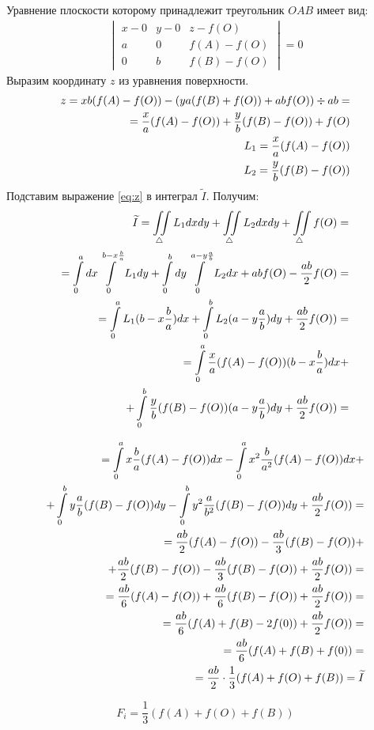 \documentclass{article}
\begin{document}
\begin{enumerate}
Уравнение плоскости которому принадлежит треугольник $OAB$ имеет вид:
\begin{align}
\begin{vmatrix}
  x-0	& y-0	& z-f(O)	\\
  a		& 0		& f(A)-f(O)	\\
  0		& b		& f(B)-f(O)
\end{vmatrix}
= 0
\end{align}
Выразим координату $z$ из уравнения поверхности.
\begin{align}
z = xb(f(A)-f(O))-(ya(f(B)+f(O))+abf(O)) \div ab = \notag \\
= \frac{x}{a}(f(A)-f(O))+\frac{y}{b}(f(B)-f(O)) + f(O) \label{eq:z} \\
L_1 = \frac{x}{a}(f(A)-f(O)) \\
L_2 = \frac{y}{b}(f(B)-f(O))
\end{align}
Подставим выражение \ref{eq:z} в интеграл $\widetilde{I}$. Получим:
\begin{align}
\widetilde{I} = \iint\limits_{\triangle} L_1 dx dy+\iint\limits_{\triangle} L_2 dx dy+\iint\limits_{\triangle} f(O)= \notag \\
= \int\limits_0^a dx \int\limits_0^{b-x \frac{b}{a}} L_1 dy + \int\limits_0^b dy \int\limits_0^{a-y \frac{a}{b}} L_2 dx + ab f(O)- \frac{ab}{2}f(O) = \notag \\
= \int\limits_0^a L_1 (b-x \frac{b}{a}) dx + \int\limits_0^b L_2 (a-y \frac{a}{b}) dy + \frac{ab}{2} f(O)) = \\
= \int\limits_0^a \frac{x}{a} (f(A)-f(O)) (b-x \frac{b}{a}) dx + \notag \\
+ \int\limits_0^b \frac{y}{b} (f(B)-f(O)) (a-y \frac{a}{b}) dy + \frac{ab}{2} f(O)) =
\end{align}

\begin{align}
= \int\limits_0^a x \frac{b}{a} (f(A)-f(O)) dx - \int\limits_0^a x^2 \frac{b}{a^2} (f(A)-f(O)) dx + \notag \\
+ \int\limits_0^b y \frac{a}{b} (f(B)-f(O)) dy - \int\limits_0^b y^2 \frac{a}{b^2}(f(B)-f(O))dy + \frac{ab}{2} f(O)) = \\
= \frac{ab}{2} (f(A)-f(O)) - \frac{ab}{3} (f(B)-f(O)) + \notag \\
+ \frac{ab}{2}(f(B)-f(O)) - \frac{ab}{3} (f(B)-f(O)) + \frac{ab}{2} f(O)) = \\
= \frac{ab}{6} (f(A)-f(O)) + \frac{ab}{6} (f(B)-f(O)) + \frac{ab}{2} f(O)) = \\
= \frac{ab}{6} (f(A)+f(B)-2f(0)) + \frac{ab}{2} f(O)) = \\
= \frac{ab}{6} (f(A)+f(B)+f(0)) = \\
= \frac{ab}{2} \cdot \frac{1}{3}(f(A)+f(O)+f(B)) = \widetilde{I}
\end{align}

\begin{equation}
F_i =  \frac{1}{3}(f(A)+f(O)+f(B))
\end{equation}

\end{enumerate}
\end{document}
